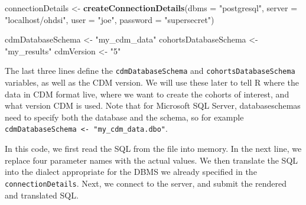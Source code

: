 \documentclass[
]{article}
\newenvironment{Shaded}{\begin{snugshade}}{\end{snugshade}}
\newcommand{\DataTypeTok}[1]{\textcolor[rgb]{0.13,0.29,0.53}{#1}}
\newcommand{\KeywordTok}[1]{\textcolor[rgb]{0.13,0.29,0.53}{\textbf{#1}}}
\newcommand{\NormalTok}[1]{#1}
\newcommand{\OperatorTok}[1]{\textcolor[rgb]{0.81,0.36,0.00}{\textbf{#1}}}
\newcommand{\StringTok}[1]{\textcolor[rgb]{0.31,0.60,0.02}{#1}}
\begin{document}
\begin{Shaded}
\begin{Highlighting}[]
\NormalTok{    connectionDetails <-}\StringTok{ }\KeywordTok{createConnectionDetails}\NormalTok{(}\DataTypeTok{dbms =} \StringTok{"postgresql"}\NormalTok{, }
                                                 \DataTypeTok{server =} \StringTok{"localhost/ohdsi"}\NormalTok{, }
                                                 \DataTypeTok{user =} \StringTok{"joe"}\NormalTok{, }
                                                 \DataTypeTok{password =} \StringTok{"supersecret"}\NormalTok{)}
    
\NormalTok{    cdmDatabaseSchema <-}\StringTok{ "my_cdm_data"}
\NormalTok{    cohortsDatabaseSchema <-}\StringTok{ "my_results"}
\NormalTok{    cdmVersion <-}\StringTok{ "5"}
\end{Highlighting}
\end{Shaded}

The last three lines define the \texttt{cdmDatabaseSchema} and
\texttt{cohortsDatabaseSchema} variables, as well as the CDM version. We
will use these later to tell R where the data in CDM format live, where
we want to create the cohorts of interest, and what version CDM is used.
Note that for Microsoft SQL Server, databaseschemas need to specify both
the database and the schema, so for example
\texttt{cdmDatabaseSchema\ \textless{}-\ "my\_cdm\_data.dbo"}.

\begin{Shaded}
\end{Shaded}

In this code, we first read the SQL from the file into memory. In the
next line, we replace four parameter names with the actual values. We
then translate the SQL into the dialect appropriate for the DBMS we
already specified in the \texttt{connectionDetails}. Next, we connect to
the server, and submit the rendered and translated SQL.
\end{document}
